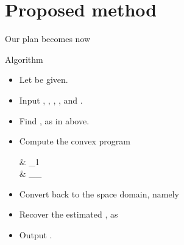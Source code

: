 \section {Proposed method}

Our plan becomes now

\Result
{Algorithm}
{
\begin {itemize}
%
\item Let  be given.
%
\item Input ,
,
,
,
and .
%
\item Find ,  as in above.
%
\item Compute the convex program
%
 {
\leftarrow \begin {cases}
 &  _1 \\
%
 \;  \quad &  _\infty \leq \g_{} \\
\end {cases} 
}
%
\item Convert  back to the space domain, namely
%
%
\item Recover the estimated , as
%
%
\item Output .
%
\end {itemize}
}


